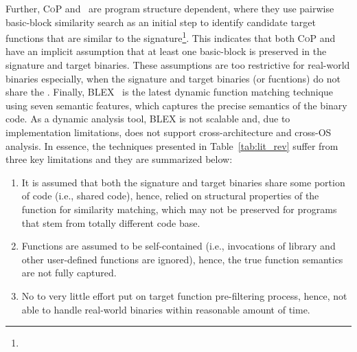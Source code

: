 Further, \textsc{\small CoP} and~\cite{DBLP:conf/sp/PewnyGGRH15} are program structure dependent, where they use pairwise basic-block similarity search as an initial step to identify candidate target functions that are similar to the signature\footnote{}. This indicates that both \textsc{\small CoP} and~\cite{DBLP:conf/sp/PewnyGGRH15} have an implicit assumption that at least one basic-block is preserved in the signature and target binaries. These assumptions are too restrictive for real-world binaries especially, when the signature and target binaries (or fucntions) do not share the . Finally, \textsc{\small BLEX}~\cite{egele2014blanket} is the latest dynamic function matching technique using seven semantic features, which captures the precise semantics of the binary code. As a dynamic analysis tool, \textsc{\small BLEX} %
is not scalable and, due to implementation limitations, does not support cross-architecture and cross-OS analysis.
In essence, the techniques presented in Table~\ref{tab:lit_rev} suffer from three key limitations and they are summarized below:
\renewcommand{\theenumi}{\arabic{enumi}}
\begin{enumerate}[label=\textbf{P\theenumi.},itemindent=*,itemsep=0.15mm]
\itemsep0em 
\item It is assumed that both the signature and target binaries share some portion of code (i.e., shared code), hence, relied on structural properties of the function for similarity matching, which may not be preserved for programs that stem from totally different code base.
\item Functions are assumed to be self-contained (i.e., invocations of library and other user-defined functions are ignored), hence, the true function semantics are not fully captured.
\item No to very little effort put on target function pre-filtering process, hence, not able to handle real-world binaries within reasonable amount of time.
\end{enumerate}

